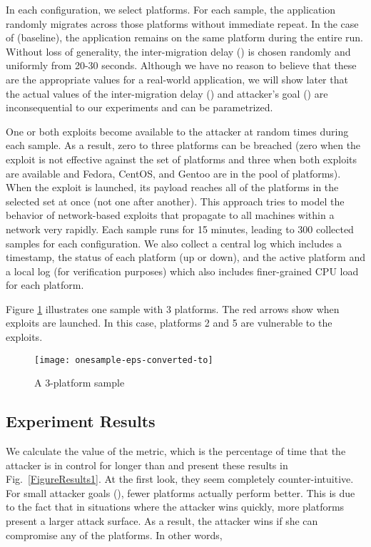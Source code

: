 \documentclass{acm_proc_article-sp}
\begin{document}
In each configuration, we select  platforms. For each sample, the application randomly migrates across those  platforms without immediate repeat. In the case of  (baseline), the application remains on the same platform during the entire run. Without loss of generality, the inter-migration delay () is chosen randomly and uniformly from 20-30 seconds. Although we have no reason to believe that these are the appropriate values for a real-world application, we will show later that the actual values
of the inter-migration delay () and attacker's goal () are inconsequential to our experiments and can be parametrized. 

One or both exploits become available to the attacker at random times during each sample. As a result, zero to three platforms can be breached (zero when the exploit is not effective against the set of platforms and three when both exploits are available and Fedora, CentOS, and Gentoo are in the pool of platforms). When the exploit is launched, its payload reaches all of the platforms in the selected set at once (not one after another). This approach tries to model the behavior of network-based exploits that propagate to all machines within a network very rapidly. Each sample runs for 15 minutes, leading to 300 collected samples for each configuration. We also collect a central log which includes a timestamp, the status of each platform (up or down), and the active platform and a local log (for verification purposes) which also includes finer-grained CPU load for each platform. 

Figure \ref{FigureSample} illustrates one sample with 3 platforms. The red arrows show when exploits are launched. In this case, platforms
2 and 5 are vulnerable to the exploits.

\begin{figure}
\begin{centering}
\texttt{[image: onesample-eps-converted-to]}
\caption{A 3-platform sample}
\label{FigureSample}
\end{centering}
\end{figure}

\subsection{Experiment Results}
\label{SS:ExperimentalResults}
We calculate the value of the metric, which is the percentage of time that the attacker is in control for longer than  and present these results in Fig.~\ref{FigureResults1}.  At the first look, they seem completely counter-intuitive. For small attacker goals (), fewer platforms actually perform better. This is due to the fact that in situations where the attacker wins quickly, more platforms present a larger attack surface. As a result, the attacker wins if she can compromise any of the platforms. In other words,
\end{document}
